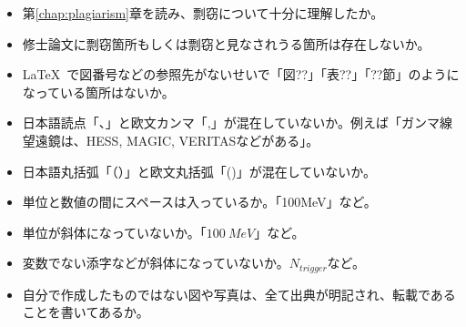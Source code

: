 \begin{itemize}
\item[\CID{00728}] 第\ref{chap:plagiarism}章を読み、剽窃について十分に理解したか。
\item[\CID{00728}] 修士論文に剽窃箇所もしくは剽窃と見なされうる箇所は存在しないか。
\item[\CID{00728}] \LaTeX\ で図番号などの参照先がないせいで「図??」「表??」「??節」のようになっている箇所はないか。
\item[\CID{00728}] 日本語読点「、」と欧文カンマ「,」が混在していないか。例えば「ガンマ線望遠鏡は、HESS, MAGIC, VERITASなどがある」。
\item[\CID{00728}] 日本語丸括弧「（）」と欧文丸括弧「()」が混在していないか。
\item[\CID{00728}] 単位と数値の間にスペースは入っているか。「100MeV」など。
\item[\CID{00728}] 単位が斜体になっていないか。「$100~MeV$」など。
\item[\CID{00728}] 変数でない添字などが斜体になっていないか。$N_{trigger}$など。
\item[\CID{00728}] 自分で作成したものではない図や写真は、全て出典が明記され、転載であることを書いてあるか。
\end{itemize}
